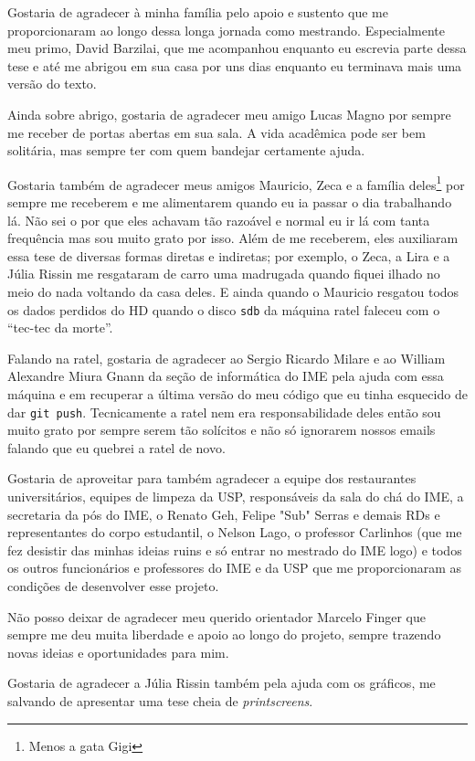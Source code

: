 \documentclass[12pt,twoside,brazilian,english]{book}
\begin{document}
Gostaria de agradecer à minha família pelo apoio e sustento que me proporcionaram ao longo dessa longa jornada como mestrando. Especialmente meu primo, David Barzilai, que me acompanhou enquanto eu escrevia parte dessa tese e até me abrigou em sua casa por uns dias enquanto eu terminava mais uma versão do texto.

Ainda sobre abrigo, gostaria de agradecer meu amigo Lucas Magno por sempre me receber de portas abertas em sua sala. A vida acadêmica pode ser bem solitária, mas sempre ter com quem bandejar certamente ajuda.

Gostaria também de agradecer meus amigos Mauricio, Zeca e a família deles\footnote{Menos a gata Gigi} por sempre me receberem e me alimentarem quando eu ia passar o dia trabalhando lá. Não sei o por que eles achavam tão razoável e normal eu ir lá com tanta frequência mas sou muito grato por isso.
Além de me receberem, eles auxiliaram essa tese de diversas formas diretas e indiretas; por exemplo, o Zeca, a Lira e a Júlia Rissin me resgataram de carro uma madrugada quando fiquei ilhado no meio do nada voltando da casa deles. E ainda quando o Mauricio resgatou todos os dados perdidos do HD quando o disco \texttt{sdb} da máquina ratel faleceu com o ``tec-tec da morte''.

Falando na ratel, gostaria de agradecer ao Sergio Ricardo Milare e ao William Alexandre Miura Gnann da seção de informática do IME pela ajuda com essa máquina e em recuperar a última versão do meu código que eu tinha esquecido de dar \texttt{git push}. Tecnicamente a ratel nem era responsabilidade deles então sou muito grato por sempre serem tão solícitos e não só ignorarem nossos emails falando que eu quebrei a ratel de novo. 

Gostaria de aproveitar para também agradecer a equipe dos restaurantes universitários, equipes de limpeza da USP, responsáveis da sala do chá do IME, a secretaria da pós do IME, o Renato Geh, Felipe "Sub" Serras e demais RDs e representantes do corpo estudantil, o Nelson Lago, o professor Carlinhos (que me fez desistir das minhas ideias ruins e só entrar no mestrado do IME logo) e todos os outros funcionários e professores do IME e da USP que me proporcionaram as condições de desenvolver esse projeto.


Não posso deixar de agradecer meu querido orientador Marcelo Finger que sempre me deu muita liberdade e apoio ao longo do projeto, sempre trazendo novas ideias e oportunidades para mim.

Gostaria de agradecer a Júlia Rissin também pela ajuda com os gráficos, me salvando de apresentar uma tese cheia de \textit{printscreens}.
\end{document}
